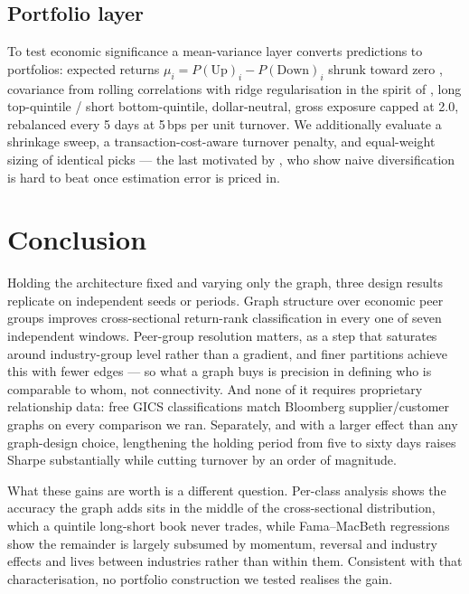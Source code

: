 \documentclass[11pt]{airesearch}
\begin{document}
\subsection{Portfolio layer}
To test economic significance a mean-variance layer \citep{markowitz1952portfolio}
converts predictions to portfolios: expected returns $\mu_i = P(\text{Up})_i -
P(\text{Down})_i$ shrunk toward zero \citep{michaud1989markowitz}, covariance
from rolling correlations with ridge regularisation in the spirit of
\citet{ledoit2004wellconditioned}, long top-quintile / short bottom-quintile,
dollar-neutral, gross exposure capped at 2.0, rebalanced every 5 days at
5\,bps per unit turnover. We additionally evaluate a shrinkage sweep, a
transaction-cost-aware turnover penalty, and equal-weight sizing of identical
picks --- the last motivated by \citet{demiguel2009optimal}, who show naive
diversification is hard to beat once estimation error is priced in.



\section{Conclusion}

Holding the architecture fixed and varying only the graph, three design
results replicate on independent seeds or periods. Graph structure over
economic peer groups improves cross-sectional return-rank classification in
every one of seven independent windows. Peer-group resolution matters, as a
step that saturates around industry-group level rather than a gradient, and
finer partitions achieve this with fewer edges --- so what a graph buys is
precision in defining who is comparable to whom, not connectivity. And none
of it requires proprietary relationship data: free GICS classifications match
Bloomberg supplier/customer graphs on every comparison we ran. Separately, and
with a larger effect than any graph-design choice, lengthening the holding
period from five to sixty days raises Sharpe substantially while cutting
turnover by an order of magnitude.

What these gains are worth is a different question. Per-class analysis shows
the accuracy the graph adds sits in the middle of the cross-sectional
distribution, which a quintile long-short book never trades, while
Fama--MacBeth regressions show the remainder is largely subsumed by momentum,
reversal and industry effects and lives between industries rather than within
them. Consistent with that characterisation, no portfolio construction we
tested realises the gain.
\end{document}
